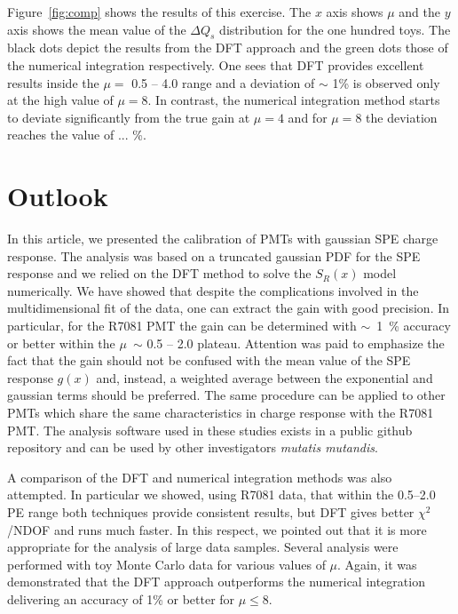 \documentclass[a4paper,11pt]{article}
\begin{document}
Figure~\ref{fig:comp} shows the results of this exercise. 
The $x$ axis shows $\mu$ and the $y$ axis shows the mean value of the $\Delta Q_s$ distribution for the one hundred toys. 
The black dots depict the results from the DFT approach and the green dots those of the numerical integration respectively. 
One sees that DFT provides excellent results inside the $\mu = $ 0.5 -- 4.0 range and a deviation of $\sim$ 1\% is observed only at the high value of $\mu=8$. 
In contrast, the numerical integration method starts to deviate significantly from the true gain at $\mu=4$ and for $\mu=8$ the deviation reaches the value of ... \%. 



\section{Outlook}
\label{sec:outro}

In this article, we presented the calibration of PMTs with gaussian SPE charge response. %
The analysis was based on a truncated gaussian PDF for the SPE response and we relied on the DFT method to solve the $S_R(x)$ model numerically. 
We have showed that despite the complications involved in the multidimensional fit of the data, one can extract the gain with good precision. 
In particular, for the R7081 PMT the gain can be determined with $\sim$~1~\% accuracy or better within the $\mu$~$\sim$ 0.5 -- 2.0 plateau. 
Attention was paid to emphasize the fact that the gain should not be confused with the mean value of the SPE response $g(x)$ and, instead, a weighted average between the exponential and gaussian terms should be preferred. 
The same procedure can be applied to other PMTs which share the same characteristics in charge response with the R7081 PMT. 
The analysis software used in these studies exists in a public github repository and can be used by other investigators \emph{mutatis mutandis}. 

A comparison of the DFT and numerical integration methods was also attempted. 
In particular we showed, using R7081 data, that within the 0.5--2.0 PE range both techniques provide consistent results, but DFT gives better $\chi^2$/NDOF and runs much faster. 
In this respect, we pointed out that it is more appropriate for the analysis of large data samples. 
Several analysis were performed with toy Monte Carlo data for various values of $\mu$. 
Again, it was demonstrated that the DFT approach outperforms the numerical integration delivering an accuracy of 1\% or better for $\mu\le 8 $. 
\end{document}
